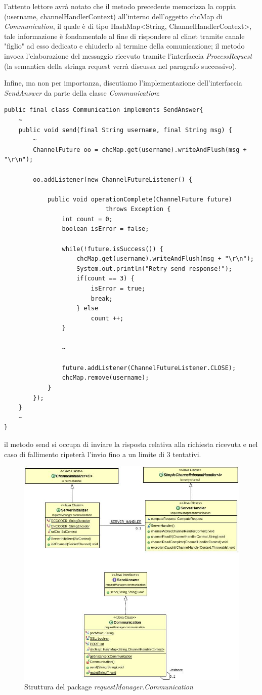 l'attento lettore avrà notato che il metodo precedente memorizza la coppia (username, channelHandlerContext) all'interno dell'oggetto chcMap di \textit{Communication}, il quale è di tipo HashMap<String, ChannelHandlerContext>, tale informazione è fondamentale al fine di rispondere al clinet tramite canale "figlio" ad esso dedicato e chiuderlo al termine della comunicazione; il metodo invoca l'elaborazione del messaggio ricevuto tramite l'interfaccia \textit{ProcessRequest} (la semantica della stringa request verrà discussa nel paragrafo successivo).


Infine, ma non per importanza, discutiamo l'implementazione dell'interfaccia \textit{SendAnswer} da parte della classe \textit{Communication}:
\begin{lstlisting}
public final class Communication implements SendAnswer{
	~
	public void send(final String username, final String msg) {
		~
		ChannelFuture oo = chcMap.get(username).writeAndFlush(msg + "\r\n");
		
		oo.addListener(new ChannelFutureListener() {
		
			public void operationComplete(ChannelFuture future)	
							throws Exception {
				int count = 0;
				boolean isError = false;
				
				while(!future.isSuccess()) {
					chcMap.get(username).writeAndFlush(msg + "\r\n");
					System.out.println("Retry send response!");
					if(count == 3) {
						isError = true;
						break;
					} else 
						count ++;
				}
				
				~
				
				future.addListener(ChannelFutureListener.CLOSE);
				chcMap.remove(username);
			}
		});
	}
	~
}
\end{lstlisting}
il metodo send si occupa di inviare la risposta relativa alla richiesta ricevuta e nel caso di fallimento ripeterà l'invio fino a un limite di 3 tentativi.
\begin{figure}
	\includegraphics[width=\textwidth]{Immagini/CommunicationPackage}
	\caption{Struttura del package \textit{requestManager.Communication}}
	\label{fig:xx}
\end{figure}



